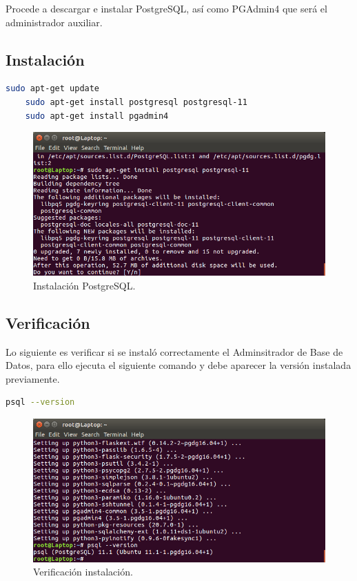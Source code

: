 \bigbreak
Procede a descargar e instalar PostgreSQL, así como PGAdmin4 que será el administrador auxiliar.

\subsection{Instalación}
\begin{lstlisting}[language=bash]
    sudo apt-get update
    sudo apt-get install postgresql postgresql-11
    sudo apt-get install pgadmin4
\end{lstlisting}

\begin{figure}[H]
	\begin{center}
		\includegraphics[scale=0.35]{images/INST/4.png}
		\caption{Instalación PostgreSQL.}
	\end{center}
\end{figure}

\bigbreak
\subsection{Verificación}

Lo siguiente es verificar si se instaló correctamente el Adminsitrador de Base de Datos, para ello ejecuta el siguiente comando y debe aparecer la versión instalada previamente.
\begin{lstlisting}[language=bash]
    psql --version
\end{lstlisting}

\begin{figure}[H]
	\begin{center}
		\includegraphics[scale=0.35]{images/INST/5.png}
		\caption{Verificación instalación.}
	\end{center}
\end{figure}

